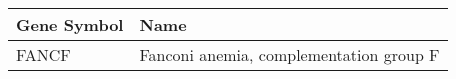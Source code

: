\begin{tabular}{ll}
\toprule
Gene Symbol &                                    Name \\
\midrule
      FANCF & Fanconi anemia, complementation group F \\
\bottomrule
\end{tabular}
